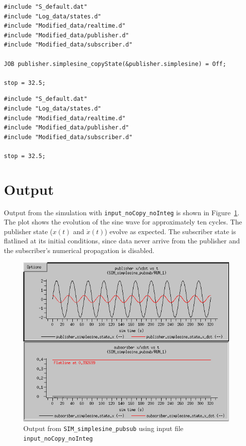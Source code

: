 \begin{lstlisting}[caption={{\tt SIM\_simplesine\_pubsub} input file, {\tt input\_noInteg}},label={list:SIM-pubsub-input-noInteg}]
#include "S_default.dat"
#include "Log_data/states.d"
#include "Modified_data/realtime.d"
#include "Modified_data/publisher.d"
#include "Modified_data/subscriber.d"

JOB publisher.simplesine_copyState(&publisher.simplesine) = Off;

stop = 32.5;
\end{lstlisting}

\begin{lstlisting}[caption={{\tt SIM\_simplesine\_pubsub} input file, {\tt input}},label={list:SIM-pubsub-input}]
#include "S_default.dat"
#include "Log_data/states.d"
#include "Modified_data/realtime.d"
#include "Modified_data/publisher.d"
#include "Modified_data/subscriber.d"

stop = 32.5;
\end{lstlisting}

\section{Output}

Output from the simulation with {\tt input\_noCopy\_noInteg}
is shown in Figure~\ref{fig:SIM-pubsub-input-noCopy-noInteg}.
The plot shows the evolution of the sine wave for approximately
ten cycles.
The publisher state ($x(t)$ and $\dot{x}(t)$) evolve as expected.
The subscriber state is flatlined at its initial conditions,
since data never arrive from the publisher and the subscriber's
numerical propagation is disabled.

\begin{figure}[b]
  \begin{center}
    \includegraphics[width=4.5in]{TrickHLAUser-prelim-SIM-pubsub-input-noCopy-noInteg.png}
  \end{center}
\caption{Output from {\tt SIM\_simplesine\_pubsub} using input file {\tt input\_noCopy\_noInteg}}
\label{fig:SIM-pubsub-input-noCopy-noInteg}
\end{figure}


